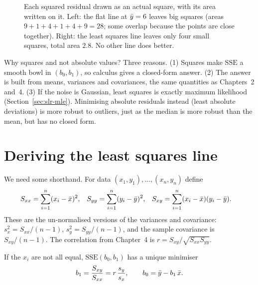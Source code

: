 \begin{figure}[H]
\caption{Each squared residual drawn as an actual square, with its area
written on it. Left: the flat line at $\bar{y}=6$ leaves big squares (areas
$9+1+4+1+4+9=28$; some overlap because the points are close together).
Right: the least squares line leaves only four small squares, total area $2.8$.
No other line does better.}
\label{fig:slr-squares}
\end{figure}

\begin{whybox}
Why squares and not absolute values? Three reasons. (1) Squares make
$\mathrm{SSE}$ a smooth bowl in $(b_0,b_1)$, so calculus gives a closed-form
answer. (2) The answer is built from means, variances and covariances, the same
quantities as Chapters~2 and~4. (3) If the noise is Gaussian, least squares is
exactly maximum likelihood (Section~\ref{sec:slr-mle}). Minimising absolute
residuals instead (least absolute deviations) is more robust to outliers, just
as the median is more robust than the mean, but has no closed form.
\end{whybox}

\section{Deriving the least squares line}
\label{sec:slr-derive}

We need some shorthand. For data $(x_1,y_1),\dots,(x_n,y_n)$ define
\begin{align*}
  S_{xx} &= \sum_{i=1}^n (x_i-\bar{x})^2, &
  S_{yy} &= \sum_{i=1}^n (y_i-\bar{y})^2, &
  S_{xy} &= \sum_{i=1}^n (x_i-\bar{x})(y_i-\bar{y}).
\end{align*}
These are the un-normalised versions of the variances and covariance:
$s_x^2 = S_{xx}/(n-1)$, $s_y^2 = S_{yy}/(n-1)$, and the sample covariance is
$S_{xy}/(n-1)$. The correlation from Chapter~4 is
$r = S_{xy}/\sqrt{S_{xx}S_{yy}}$.

\begin{theorem}
\label{thm:slr-ls}
If the $x_i$ are not all equal, $\mathrm{SSE}(b_0,b_1)$ has a unique minimiser
\[
  b_1 = \frac{S_{xy}}{S_{xx}} = r\,\frac{s_y}{s_x},
  \qquad
  b_0 = \bar{y} - b_1\,\bar{x} .
\]
\end{theorem}


